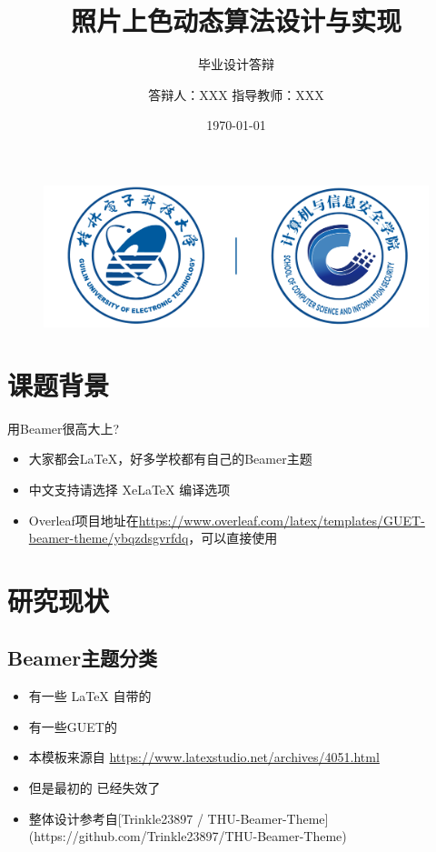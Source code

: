 \documentclass[aspectratio=169,AutoFakeBold]{beamer}
\author{答辩人：XXX \texorpdfstring{\quad}{} 指导教师：XXX}
\title{照片上色动态算法设计与实现}
\subtitle{毕业设计答辩}
\institute{计算机与信息安全学院}
\date{\today}
\begin{document}
\kaishu
\begin{frame}
    \titlepage
    \begin{figure}[htpb]
        \begin{center}
            \includegraphics[width=0.5\linewidth]{guet-3.pdf}
        \end{center}
    \end{figure}
\end{frame}

\begin{frame}
    \tableofcontents[sectionstyle=show,subsectionstyle=show/shaded/hide,subsubsectionstyle=show/shaded/hide]
    
\end{frame}


\section{课题背景}

\begin{frame}{用Beamer很高大上?}
    \begin{itemize}[<+-| alert@+>] %
        \item 大家都会\LaTeX{}，好多学校都有自己的Beamer主题
        \item 中文支持请选择 Xe\LaTeX{} 编译选项
        \item Overleaf项目地址在\url{https://www.overleaf.com/latex/templates/GUET-beamer-theme/ybqzdsgvrfdq}，可以直接使用
    \end{itemize}
\end{frame}


\section{研究现状}

\subsection{Beamer主题分类}

\begin{frame}
    \begin{itemize}
        \item 有一些 \LaTeX{} 自带的
        \item 有一些GUET的
        \item 本模板来源自 \newline \url{https://www.latexstudio.net/archives/4051.html}
        \item 但是最初的 \href{http://far.tooold.cn/post/latex/beamerdlut}{\color{purple}{link}}\cite{吕李娜2021基于生成对抗网络的灰度照片上色方法} 已经失效了
        \item 整体设计参考自[Trinkle23897 / THU-Beamer-Theme](https://github.com/Trinkle23897/THU-Beamer-Theme)
    \end{itemize}
\end{frame}
\end{document}
